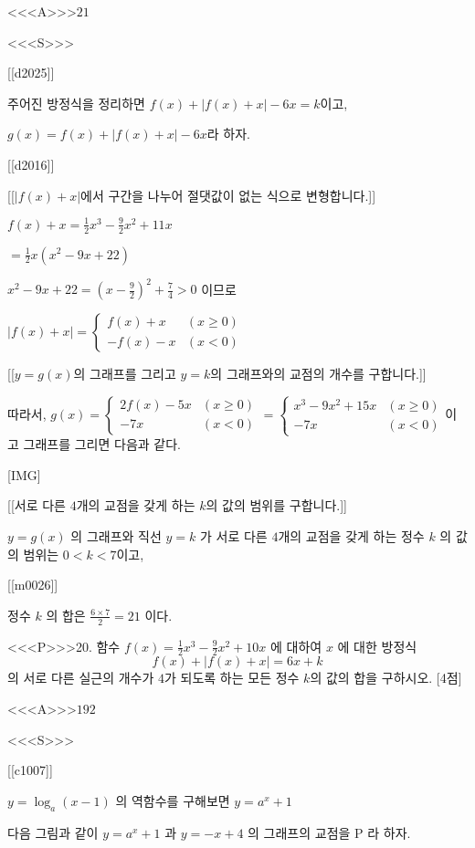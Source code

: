 \documentclass{oblivoir}
\begin{document}
<<<A>>>$21$

<<<S>>>

[[d2025]]

주어진 방정식을 정리하면 $f(x)+ \left| f(x)+x \right| -6x =k$이고,

$g(x)=f(x)+ \left| f(x)+x \right| -6x $라 하자.

[[d2016]]

[[$\left| f(x)+x \right|$에서 구간을 나누어 절댓값이 없는 식으로 변형합니다.]]

$f(x)+x=\frac{1}{2} x^{3}-\frac{9}{2} x^{2}+11 x$

$=\frac{1}{2} x\left(x^{2}-9 x+22\right)$

$x^{2}-9 x+22=\left(x-\frac{9}{2}\right)^{2}+\frac{7}{4}>0 $ 이므로

$|f(x)+x|= \begin{cases}f(x)+x & (x \geq 0) \\
-f(x)-x & (x<0)\end{cases}$

[[$y=g(x)$의 그래프를 그리고 $y=k$의 그래프와의 교점의 개수를 구합니다.]]

따라서, 
$g(x)=\begin{cases} 2f(x)-5x & (x \geq 0) \\
    -7x & (x<0)\end{cases} = \begin{cases}
x^{3}-9 x^{2}+15 x & (x \geq 0) \\
-7 x & (x<0)
\end{cases}$이고 그래프를 그리면 다음과 같다.

[IMG]

[[서로 다른 $4$개의 교점을 갖게 하는 $k$의 값의 범위를 구합니다.]]

$y=g(x)$ 의 그래프와 직선 $y=k$ 가 서로 다른 $4$개의 교점을 갖게 하는 정수 $k$ 의 값의 범위는 $0 < k < 7$이고,

[[m0026]]

정수 $k$ 의 합은 $\frac{6 \times 7}{2}=21$ 이다.


<<<P>>>20. 함수 $f(x)=\frac{1}{2} x^{3}-\frac{9}{2} x^{2}+10 x$ 에 대하여 $x$ 에 대한 방정식
$$
f(x)+|f(x)+x|=6 x+k
$$
의 서로 다른 실근의 개수가 $4$가 되도록 하는 모든 정수 $k$의 값의 합을 구하시오. [4점]

<<<A>>>$192$

<<<S>>>

[[c1007]]

$y=\log _{a}(x-1)$ 의 역함수를 구해보면 $y=a^{x}+1$

다음 그림과 같이 $y=a^{x}+1$ 과 $y=-x+4$ 의 그래프의 교점을 $\mathrm{P}$ 라 하자.
\end{document}
